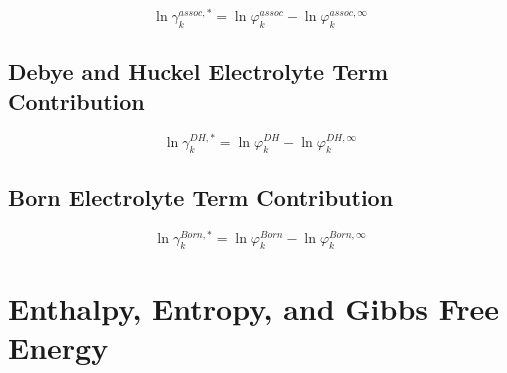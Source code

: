 \documentclass[12pt, letterpaper]{article}
\begin{document}

\begin{equation}
    \ln\gamma_{k}^{assoc,*}
    =
    \ln\varphi_{k}^{assoc}
    -
    \ln\varphi_{k}^{assoc,\infty}
    \label{eq:lngamma_assoc_asym}
\end{equation}

\subsection{Debye and Huckel Electrolyte Term Contribution}


\begin{equation}
    \ln\gamma_{k}^{DH,*}
    =
    \ln\varphi_{k}^{DH}
    -
    \ln\varphi_{k}^{DH,\infty}
    \label{eq:lngamma_dh_asym}
\end{equation}

\subsection{Born Electrolyte Term Contribution}


\begin{equation}
    \ln\gamma_{k}^{Born,*}
    =
    \ln\varphi_{k}^{Born}
    -
    \ln\varphi_{k}^{Born,\infty}
    \label{eq:lngamma_born_asym}
\end{equation}


\section{Enthalpy, Entropy, and Gibbs Free Energy}
\end{document}
